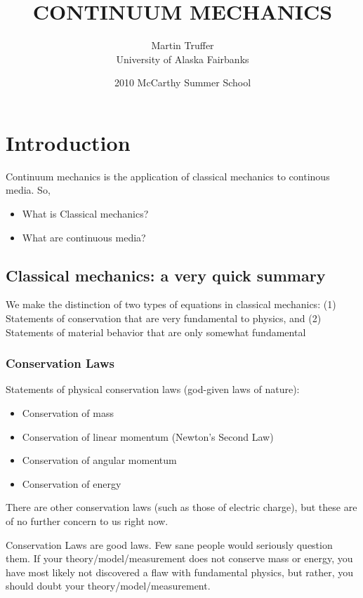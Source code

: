 \documentclass[12pt, openany]{memoir}
\begin{document}
\title{CONTINUUM MECHANICS}
\author{Martin Truffer\\ University of Alaska Fairbanks}
\date{2010 McCarthy Summer School}

\maketitle
\pagebreak
\tableofcontents
\pagebreak

\chapter{Introduction}

Continuum mechanics is the application of classical mechanics to
continous media. So,

\begin{itemize}
\item What is Classical mechanics?
\item What are continuous media?
\end{itemize}

\section{Classical mechanics: a very quick summary}

We make the distinction of two types of equations in classical
mechanics: (1) Statements of conservation that are very fundamental to
physics, and (2) Statements of material behavior that are only
somewhat fundamental

\subsection{Conservation Laws}

Statements of physical conservation laws (god-given laws of nature):

\begin{itemize}
\item Conservation of mass
\item Conservation of linear momentum (Newton's Second Law)
\item Conservation of angular momentum
\item Conservation of energy
\end{itemize}

There are other conservation laws (such as those of electric charge),
but these are of no further concern to us right now.

Conservation Laws are good laws. Few sane people would seriously
question them. If your theory/model/measurement does not conserve mass
or energy, you have most likely not discovered a flaw with fundamental physics,
but rather, you should doubt your theory/model/measurement.
\end{document}
